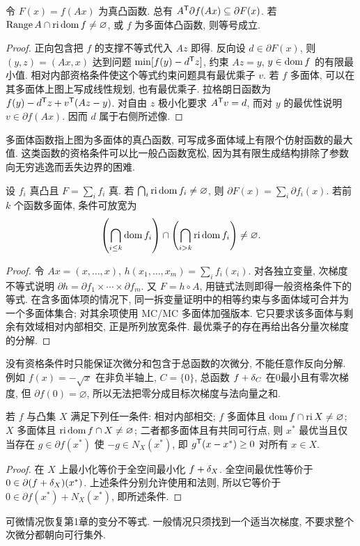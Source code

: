 \begin{theorem}\label{thm:subgrad-chain}
令 $F(x)=f(Ax)$ 为真凸函数. 总有 $A^{\mathsf T}\partial f(Ax)\subseteq\partial F(x)$. 若 $\operatorname{Range}A\cap\operatorname{ri}\operatorname{dom} f\ne\varnothing$, 或 $f$ 为多面体凸函数, 则等号成立.
\end{theorem}
\begin{proof}
正向包含把 $f$ 的支撑不等式代入 $Az$ 即得. 反向设 $d\in\partial F(x)$, 则 $(y,z)=(Ax,x)$ 达到问题 $\min[f(y)-d^{\mathsf T} z]$, 约束 $Az=y$, $y\in\operatorname{dom} f$ 的有限最小值. 相对内部资格条件使这个等式约束问题具有最优乘子 $v$. 若 $f$ 多面体, 可以在其多面体上图上写成线性规划, 也有最优乘子. 拉格朗日函数为 $f(y)-d^{\mathsf T} z+v^{\mathsf T}(Az-y)$. 对自由 $z$ 极小化要求 $A^{\mathsf T} v=d$, 而对 $y$ 的最优性说明 $v\in\partial f(Ax)$. 因而 $d$ 属于右侧所述像.
\end{proof}
多面体函数指上图为多面体的真凸函数, 可写成多面体域上有限个仿射函数的最大值. 这类函数的资格条件可以比一般凸函数宽松, 因为其有限生成结构排除了参数向无穷逃逸而丢失边界的困难.

\begin{theorem}\label{thm:subgrad-sum}
设 $f_i$ 真凸且 $F=\sum_i f_i$ 真. 若 $\bigcap_i\operatorname{ri}\operatorname{dom} f_i\ne\varnothing$, 则 $\partial F(x)=\sum_i\partial f_i(x)$. 若前 $k$ 个函数多面体, 条件可放宽为
\[
\left(\bigcap_{i\le k}\operatorname{dom} f_i\right)\cap
\left(\bigcap_{i>k}\operatorname{ri}\operatorname{dom} f_i\right)\ne\varnothing.
\]
\end{theorem}
\begin{proof}
令 $A x=(x,\ldots,x)$, $h(x_1,\ldots,x_m)=\sum_i f_i(x_i)$. 对各独立变量, 次梯度不等式说明 $\partial h=\partial f_1\times\cdots\times\partial f_m$. 又 $F=h\circ A$, 用链式法则即得一般资格条件下的等式. 在含多面体项的情况下, 同一拆变量证明中的相等约束与多面体域可合并为一个多面体集合; 对其余项使用 MC/MC 多面体加强版本. 它只要求该多面体与剩余有效域相对内部相交, 正是所列放宽条件. 最优乘子的存在再给出各分量次梯度的分解.
\end{proof}
没有资格条件时只能保证次微分和包含于总函数的次微分, 不能任意作反向分解. 例如 $f(x)=-\sqrt x$ 在非负半轴上, $C=\{0\}$, 总函数 $f+\delta_{C}$ 在0最小且有零次梯度, 但 $\partial f(0)=\varnothing$, 所以无法把零分成目标次梯度与法向量之和.

\begin{theorem}[约束次梯度最优性]
若 $f$ 与凸集 $X$ 满足下列任一条件: 相对内部相交; $f$ 多面体且 $\operatorname{dom} f\cap\operatorname{ri} X\ne\varnothing$; $X$ 多面体且 $\operatorname{ri}\operatorname{dom} f\cap X\ne\varnothing$; 二者都多面体且有共同可行点, 则 $x^*$ 最优当且仅当存在 $g\in\partial f(x^*)$ 使 $-g\in N_X(x^*)$, 即 $g^{\mathsf T}(x-x^*)\ge0$ 对所有 $x\in X$.
\end{theorem}
\begin{proof}
在 $X$ 上最小化等价于全空间最小化 $f+\delta_{X}$. 全空间最优性等价于 $0\in\partial(f+\delta_{X})(x^*)$. 上述条件分别允许使用和法则, 所以它等价于 $0\in\partial f(x^*)+N_X(x^*)$, 即所述条件.
\end{proof}
可微情况恢复第1章的变分不等式. 一般情况只须找到一个适当次梯度, 不要求整个次微分都朝向可行集外.

